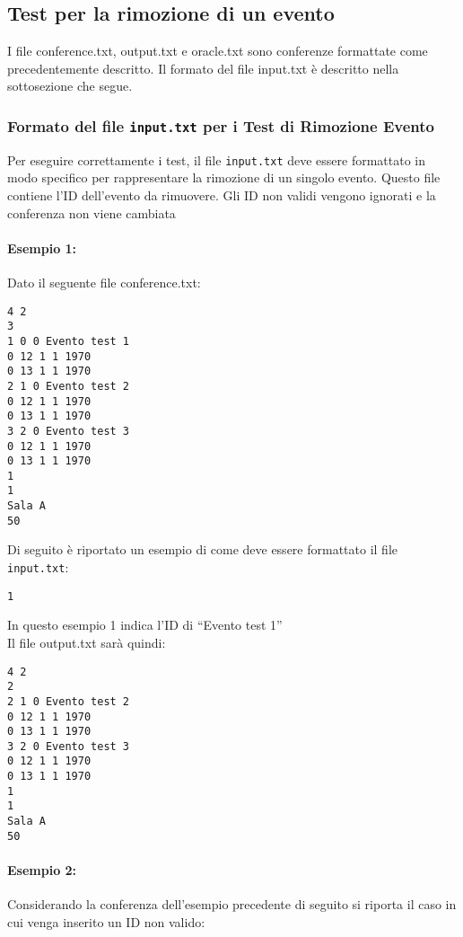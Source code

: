 \documentclass[11pt]{scrartcl} %
\begin{document}
\subsection{Test per la rimozione di un evento}
I file conference.txt, output.txt e oracle.txt sono conferenze formattate come precedentemente descritto. Il formato del file input.txt è descritto nella sottosezione che segue.

\subsubsection{Formato del file \texttt{input.txt} per i Test di Rimozione Evento}

Per eseguire correttamente i test, il file \texttt{input.txt} deve essere formattato in modo specifico per rappresentare la rimozione di un singolo evento. Questo file contiene l'ID dell'evento da rimuovere.
Gli ID non validi vengono ignorati e la conferenza non viene cambiata


\paragraph{Esempio 1:}
Dato il seguente file conference.txt:
\begin{lstlisting}
4 2
3
1 0 0 Evento test 1
0 12 1 1 1970
0 13 1 1 1970
2 1 0 Evento test 2
0 12 1 1 1970
0 13 1 1 1970
3 2 0 Evento test 3
0 12 1 1 1970
0 13 1 1 1970
1
1
Sala A
50
\end{lstlisting}

Di seguito è riportato un esempio di come deve essere formattato il file \texttt{input.txt}:

\begin{lstlisting}
1
\end{lstlisting}

In questo esempio 1 indica l'ID di ``Evento test 1''\\
Il file output.txt sarà quindi:

\begin{lstlisting}
4 2
2
2 1 0 Evento test 2
0 12 1 1 1970
0 13 1 1 1970
3 2 0 Evento test 3
0 12 1 1 1970
0 13 1 1 1970
1
1
Sala A
50
\end{lstlisting}


\paragraph{Esempio 2:}

Considerando la conferenza dell'esempio precedente di seguito si riporta il caso in cui venga inserito un ID non valido:
\end{document}
